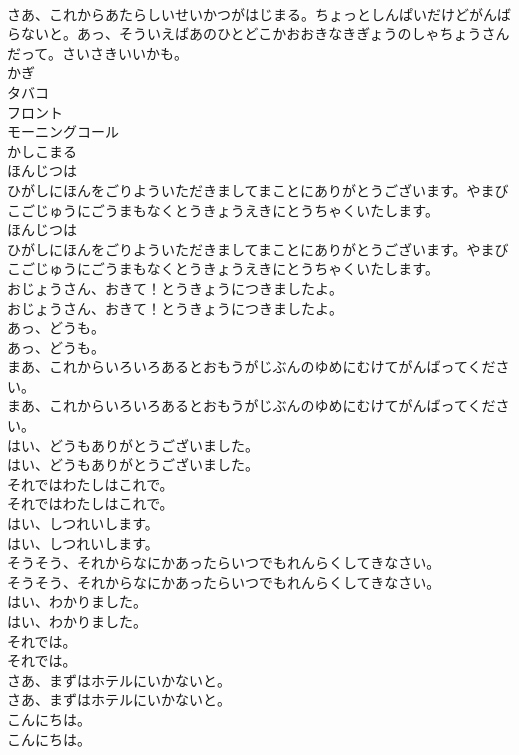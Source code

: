 \documentclass[8pt]{extreport}
\begin{document}
\begin{CJK}{UTF8}{min}
\\	さあ、これからあたらしいせいかつがはじまる。ちょっとしんぱいだけどがんばらないと。あっ、そういえばあのひとどこかおおきなきぎょうのしゃちょうさんだって。さいさきいいかも。
\\	かぎ
\\	タバコ
\\	フロント
\\	モーニングコール
\\	かしこまる
\\	ほんじつは
\\	ひがしにほんをごりよういただきましてまことにありがとうございます。やまびこごじゅうにごうまもなくとうきょうえきにとうちゃくいたします。
\\	ほんじつは
\\	ひがしにほんをごりよういただきましてまことにありがとうございます。やまびこごじゅうにごうまもなくとうきょうえきにとうちゃくいたします。
\\	おじょうさん、おきて！とうきょうにつきましたよ。
\\	おじょうさん、おきて！とうきょうにつきましたよ。
\\	あっ、どうも。
\\	あっ、どうも。
\\	まあ、これからいろいろあるとおもうがじぶんのゆめにむけてがんばってください。
\\	まあ、これからいろいろあるとおもうがじぶんのゆめにむけてがんばってください。
\\	はい、どうもありがとうございました。
\\	はい、どうもありがとうございました。
\\	それではわたしはこれで。
\\	それではわたしはこれで。
\\	はい、しつれいします。
\\	はい、しつれいします。
\\	そうそう、それからなにかあったらいつでもれんらくしてきなさい。
\\	そうそう、それからなにかあったらいつでもれんらくしてきなさい。
\\	はい、わかりました。
\\	はい、わかりました。
\\	それでは。
\\	それでは。
\\	さあ、まずはホテルにいかないと。
\\	さあ、まずはホテルにいかないと。
\\	こんにちは。
\\	こんにちは。

\end{CJK}
\end{document}
